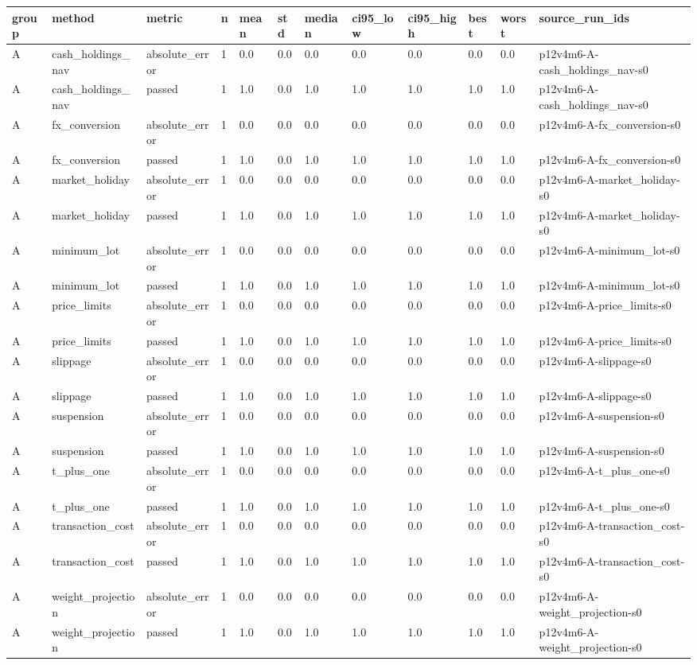 \begin{tabular}{llllllllllll}
\toprule
group & method & metric & n & mean & std & median & ci95\_low & ci95\_high & best & worst & source\_run\_ids \\
\midrule
A & cash\_holdings\_nav & absolute\_error & 1 & 0.0 & 0.0 & 0.0 & 0.0 & 0.0 & 0.0 & 0.0 & p12v4m6-A-cash\_holdings\_nav-s0 \\
A & cash\_holdings\_nav & passed & 1 & 1.0 & 0.0 & 1.0 & 1.0 & 1.0 & 1.0 & 1.0 & p12v4m6-A-cash\_holdings\_nav-s0 \\
A & fx\_conversion & absolute\_error & 1 & 0.0 & 0.0 & 0.0 & 0.0 & 0.0 & 0.0 & 0.0 & p12v4m6-A-fx\_conversion-s0 \\
A & fx\_conversion & passed & 1 & 1.0 & 0.0 & 1.0 & 1.0 & 1.0 & 1.0 & 1.0 & p12v4m6-A-fx\_conversion-s0 \\
A & market\_holiday & absolute\_error & 1 & 0.0 & 0.0 & 0.0 & 0.0 & 0.0 & 0.0 & 0.0 & p12v4m6-A-market\_holiday-s0 \\
A & market\_holiday & passed & 1 & 1.0 & 0.0 & 1.0 & 1.0 & 1.0 & 1.0 & 1.0 & p12v4m6-A-market\_holiday-s0 \\
A & minimum\_lot & absolute\_error & 1 & 0.0 & 0.0 & 0.0 & 0.0 & 0.0 & 0.0 & 0.0 & p12v4m6-A-minimum\_lot-s0 \\
A & minimum\_lot & passed & 1 & 1.0 & 0.0 & 1.0 & 1.0 & 1.0 & 1.0 & 1.0 & p12v4m6-A-minimum\_lot-s0 \\
A & price\_limits & absolute\_error & 1 & 0.0 & 0.0 & 0.0 & 0.0 & 0.0 & 0.0 & 0.0 & p12v4m6-A-price\_limits-s0 \\
A & price\_limits & passed & 1 & 1.0 & 0.0 & 1.0 & 1.0 & 1.0 & 1.0 & 1.0 & p12v4m6-A-price\_limits-s0 \\
A & slippage & absolute\_error & 1 & 0.0 & 0.0 & 0.0 & 0.0 & 0.0 & 0.0 & 0.0 & p12v4m6-A-slippage-s0 \\
A & slippage & passed & 1 & 1.0 & 0.0 & 1.0 & 1.0 & 1.0 & 1.0 & 1.0 & p12v4m6-A-slippage-s0 \\
A & suspension & absolute\_error & 1 & 0.0 & 0.0 & 0.0 & 0.0 & 0.0 & 0.0 & 0.0 & p12v4m6-A-suspension-s0 \\
A & suspension & passed & 1 & 1.0 & 0.0 & 1.0 & 1.0 & 1.0 & 1.0 & 1.0 & p12v4m6-A-suspension-s0 \\
A & t\_plus\_one & absolute\_error & 1 & 0.0 & 0.0 & 0.0 & 0.0 & 0.0 & 0.0 & 0.0 & p12v4m6-A-t\_plus\_one-s0 \\
A & t\_plus\_one & passed & 1 & 1.0 & 0.0 & 1.0 & 1.0 & 1.0 & 1.0 & 1.0 & p12v4m6-A-t\_plus\_one-s0 \\
A & transaction\_cost & absolute\_error & 1 & 0.0 & 0.0 & 0.0 & 0.0 & 0.0 & 0.0 & 0.0 & p12v4m6-A-transaction\_cost-s0 \\
A & transaction\_cost & passed & 1 & 1.0 & 0.0 & 1.0 & 1.0 & 1.0 & 1.0 & 1.0 & p12v4m6-A-transaction\_cost-s0 \\
A & weight\_projection & absolute\_error & 1 & 0.0 & 0.0 & 0.0 & 0.0 & 0.0 & 0.0 & 0.0 & p12v4m6-A-weight\_projection-s0 \\
A & weight\_projection & passed & 1 & 1.0 & 0.0 & 1.0 & 1.0 & 1.0 & 1.0 & 1.0 & p12v4m6-A-weight\_projection-s0 \\
\bottomrule
\end{tabular}
